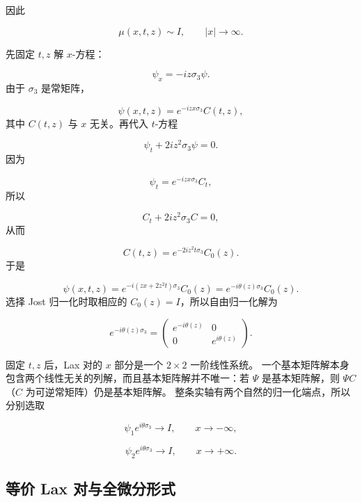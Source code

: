\documentclass[
    lang=cn,
    scheme=chinese,
    mode=simple,
    device=normal,
    color=blue,
    math=cm,
    thmcnt=section,
    12pt
]{elegantbook}
\begin{document}
因此

\begin{equation}
    \mu(x,t,z)\sim I,\qquad \lvert x\rvert\to\infty.
    \tag{5.1.6}
    \label{eq:5.1.6}
\end{equation}

\begin{callout}[计算：这个自由基本解是怎样求出来的？]
    先固定 $t,z$ 解 $x$-方程：

    \[
        \psi_x=-iz\sigma_3\psi.
    \]
    由于 $\sigma_3$ 是常矩阵，

    \[
        \psi(x,t,z)
        =
        e^{-izx\sigma_3}C(t,z),
    \]
    其中 $C(t,z)$ 与 $x$ 无关。再代入 $t$-方程

    \[
        \psi_t+2iz^2\sigma_3\psi=0.
    \]
    因为

    \[
        \psi_t=e^{-izx\sigma_3}C_t,
    \]
    所以

    \[
        C_t+2iz^2\sigma_3C=0,
    \]
    从而

    \[
        C(t,z)
        =
        e^{-2iz^2t\sigma_3}C_0(z).
    \]
    于是

    \[
        \psi(x,t,z)
        =
        e^{-i(zx+2z^2t)\sigma_3}C_0(z)
        =
        e^{-i\theta(z)\sigma_3}C_0(z).
    \]
    选择 Jost 归一化时取相应的 $C_0(z)=I$，所以自由归一化解为

    \[
        e^{-i\theta(z)\sigma_3}
        =
        \begin{pmatrix}
            e^{-i\theta(z)} & 0              \\
            0               & e^{i\theta(z)}
        \end{pmatrix}.
    \]

\end{callout}

\begin{callout}
    固定 $t,z$ 后，Lax 对的 $x$ 部分是一个 $2\times2$ 一阶线性系统。
    一个基本矩阵解本身包含两个线性无关的列解，而且基本矩阵解并不唯一：若 $\Psi$ 是基本矩阵解，则 $\Psi C$（$C$ 为可逆常矩阵）仍是基本矩阵解。
    整条实轴有两个自然的归一化端点，所以分别选取

    \[
        \psi_1e^{i\theta\sigma_3}\to I,\qquad x\to-\infty,
    \]

    \[
        \psi_2e^{i\theta\sigma_3}\to I,\qquad x\to+\infty.
    \]
\end{callout}

\subsection{等价 Lax 对与全微分形式}
\end{document}
